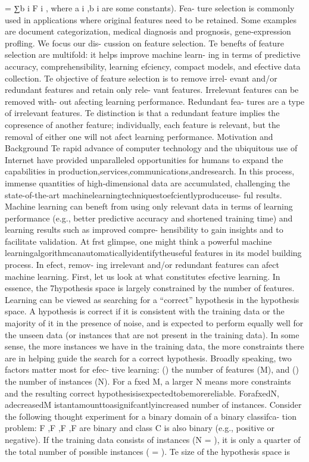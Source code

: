= ∑b i F i , where a i ,b i are some constants). 
Fea-
ture selection is commonly used in applications where
original features need to be retained. Some examples
are document categorization, medical diagnosis and
prognosis, gene-expression profling. 
We focus our dis-
cussion on feature selection. 
Te benefts of feature
selection are multifold: it helps improve machine learn-
ing in terms of predictive accuracy, comprehensibility,
learning efciency, compact models, and efective data
collection.
Te objective of feature selection is to remove irrel-
evant and/or redundant features and retain only rele-
vant features. 
Irrelevant features can be removed with-
out afecting learning performance. 
Redundant fea-
tures are a type of irrelevant features. Te distinction
is that a redundant feature implies the copresence of
another feature; individually, each feature is relevant,
but the removal of either one will not afect learning
performance.
Motivation and Background
Te rapid advance of computer technology and the
ubiquitous use of Internet have provided unparalleled
opportunities for humans to expand the capabilities in
production,services,communications,andresearch.
In
this process, immense quantities of high-dimensional
data are accumulated, challenging the state-of-the-art
machinelearningtechniquestoefcientlyproduceuse-
ful results. Machine learning can beneft from using
only relevant data in terms of learning performance
(e.g., better predictive accuracy and shortened training
time) and learning results such as improved compre-
hensibility to gain insights and to facilitate validation.
At frst glimpse, one might think a powerful machine
learningalgorithmcanautomaticallyidentifytheuseful
features in its model building process. 
In efect, remov-
ing irrelevant and/or redundant features can afect
machine learning. First, let us look at what constitutes
efective learning. In essence, the 7hypothesis space is
largely constrained by the number of features. Learning
can be viewed as searching for a “correct” hypothesis
in the hypothesis space. A hypothesis is correct if it is
consistent with the training data or the majority of it
in the presence of noise, and is expected to perform
equally well for the unseen data (or instances that are
not present in the training data). 
In some sense, the
more instances we have in the training data, the more
constraints there are in helping guide the search for a
correct hypothesis.
Broadly speaking, two factors matter most for efec-
tive learning: () the number of features (M), and
() the number of instances (N). For a fxed M, a larger
N means more constraints and the resulting correct
hypothesisisexpectedtobemorereliable.
ForafxedN,
adecreasedM istantamounttoasignifcantlyincreased
number of instances. Consider the following thought
experiment for a binary domain of a binary classifca-
tion problem: F  ,F  ,F  ,F  are binary and class C is also
binary (e.g., positive or negative). If the training data
consists of  instances (N = ), it is only a quarter
of the total number of possible instances (  = ).
Te size of the hypothesis space is  

